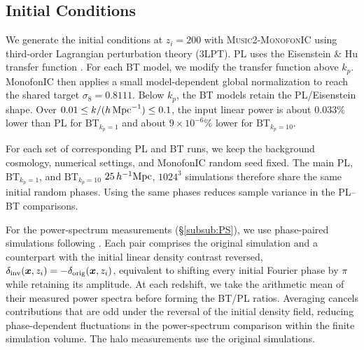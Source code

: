 \documentclass[
 reprint,
 superscriptaddress,
 nofootinbib,
 nobibnotes,
 amsmath,
 amssymb,
 aps,
 prd,
 floatfix,
 longbibliography
]{revtex4-2}
\DeclareRobustCommand{\change}[1]{#1}
\DeclareRobustCommand{\BTKPone}{\ensuremath{\mathrm{BT}_{k_p=1}}}
\DeclareRobustCommand{\BTKPten}{\ensuremath{\mathrm{BT}_{k_p=10}}}
\begin{document}
\subsection{Initial Conditions}\label{sec:IC}
\change{We generate the initial conditions at \(z_i=200\) with \textsc{Music2-MonofonIC} \citep{Hahn2020MUSIC2monofonIC,Michaux2021MUSIC2monofonIC} using third-order Lagrangian perturbation theory (3LPT). PL uses the Eisenstein \& Hu transfer function \citep{Eisenstein1998}. For each BT model, we modify the transfer function above \(k_p\). MonofonIC then applies a small model-dependent global normalization to reach the shared target \(\sigma_8=0.8111\). Below \(k_p\), the BT models retain the PL/Eisenstein shape. Over \(0.01\le k/(h\,{\rm Mpc}^{-1})\le0.1\), the input linear power is about \(0.033\%\) lower than PL for \BTKPone{} and about \(9\times10^{-6}\%\) lower for \BTKPten{}.}

For each set of corresponding PL and BT runs, we keep the background cosmology, numerical settings, and MonofonIC random seed fixed. The main PL, \BTKPone{}, and \BTKPten{} \(25\,h^{-1}{\rm Mpc}\), \(1024^3\) simulations therefore share the same initial random phases. Using the same phases reduces sample variance in the PL--BT comparisons.

For the power-spectrum measurements (\S\ref{subsub:PS}), we use phase-paired simulations following \citet{Pontzen2016Inverted}. Each pair comprises the original simulation and a counterpart with the initial linear density contrast reversed, \(\delta_{\rm inv}(\boldsymbol{x},z_i)=-\delta_{\rm orig}(\boldsymbol{x},z_i)\), equivalent to shifting every initial Fourier phase by \(\pi\) while retaining its amplitude. At each redshift, we take the arithmetic mean of their measured power spectra before forming the BT/PL ratios. Averaging cancels contributions that are odd under the reversal of the initial density field, reducing phase-dependent fluctuations in the power-spectrum comparison within the finite simulation volume. The halo measurements use the original simulations.
\end{document}

